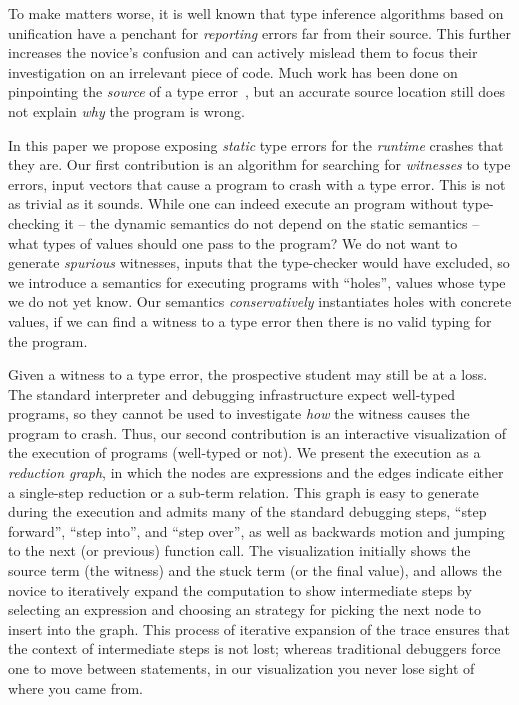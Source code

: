 To make matters worse, it is well known that type inference algorithms
based on unification have a penchant for \emph{reporting} errors far
from their source.
%
This further increases the novice's confusion and can actively mislead
them to focus their investigation on an irrelevant piece of code.
%
Much work has been done on pinpointing the \emph{source} of a type
error~\cite{zhang-myers, maxsmt, counterfactual}, but an accurate source
location still does not explain \emph{why} the program is wrong.

In this paper we propose exposing \emph{static} type errors for the
\emph{runtime} crashes that they are.
%
Our first contribution is an algorithm for searching for
\emph{witnesses} to type errors, \ie input vectors that cause a program
to crash with a type error.
%
This is not as trivial as it sounds.
%
While one can indeed execute an \ocaml program without type-checking it
-- the dynamic semantics do not depend on the static semantics -- what
types of values should one pass to the program?
%
We do not want to generate \emph{spurious} witnesses, inputs that the
type-checker would have excluded, so we introduce a semantics for
executing \ocaml programs with ``holes'', values whose type we do not
yet know.
%
%
Our semantics \emph{conservatively} instantiates holes with concrete
values, if we can find a witness to a type error then there is no valid
typing for the program.

Given a witness to a type error, the prospective \ocaml student may
still be at a loss.
%
The standard \ocaml interpreter and debugging infrastructure expect
well-typed programs, so they cannot be used to investigate \emph{how}
the witness causes the program to crash.
%
Thus, our second contribution is an interactive visualization of the
execution of \ocaml programs (well-typed or not).
%
We present the execution as a \emph{reduction graph}, in which the nodes
are expressions and the edges indicate either a single-step reduction or
a sub-term relation.
%
This graph is easy to generate during the execution and admits many of
the standard debugging steps, \eg ``step forward'', ``step into'', and
``step over'', as well as backwards motion and jumping to the next (or
previous) function call.
%
The visualization initially shows the source term (\ie the witness) and
the stuck term (or the final value), and allows the novice to
iteratively expand the computation to show intermediate steps by
selecting an expression and choosing an strategy for picking the next
node to insert into the graph.
%
This process of iterative expansion of the trace ensures that the
context of intermediate steps is not lost; whereas traditional debuggers
force one to move between statements, in our visualization you never
lose sight of where you came from.

